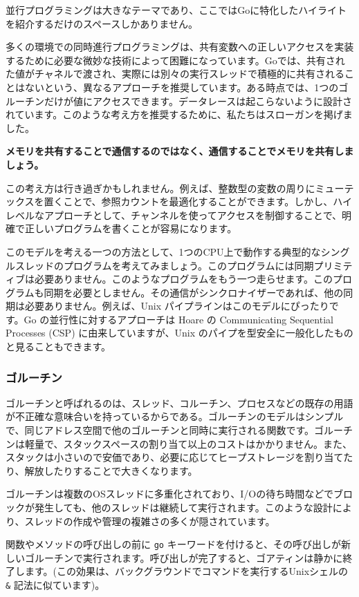 \documentclass{jsarticle}
\begin{document}
並行プログラミングは大きなテーマであり、ここではGoに特化したハイライトを紹介するだけのスペースしかありません。

多くの環境での同時進行プログラミングは、共有変数への正しいアクセスを実装するために必要な微妙な技術によって困難になっています。Goでは、共有された値がチャネルで渡され、実際には別々の実行スレッドで積極的に共有されることはないという、異なるアプローチを推奨しています。ある時点では、1つのゴルーチンだけが値にアクセスできます。データレースは起こらないように設計されています。このような考え方を推奨するために、私たちはスローガンを掲げました。

\textbf{メモリを共有することで通信するのではなく、通信することでメモリを共有しましょう。}

この考え方は行き過ぎかもしれません。例えば、整数型の変数の周りにミューテックスを置くことで、参照カウントを最適化することができます。しかし、ハイレベルなアプローチとして、チャンネルを使ってアクセスを制御することで、明確で正しいプログラムを書くことが容易になります。

このモデルを考える一つの方法として、1つのCPU上で動作する典型的なシングルスレッドのプログラムを考えてみましょう。このプログラムには同期プリミティブは必要ありません。このようなプログラムをもう一つ走らせます。このプログラムも同期を必要としません。その通信がシンクロナイザーであれば、他の同期は必要ありません。例えば、Unix
パイプラインはこのモデルにぴったりです。Go の並行性に対するアプローチは
Hoare の Communicating Sequential Processes (CSP)
に由来していますが、Unix
のパイプを型安全に一般化したものと見ることもできます。

\subsubsection{ゴルーチン}

ゴルーチンと呼ばれるのは、スレッド、コルーチン、プロセスなどの既存の用語が不正確な意味合いを持っているからである。ゴルーチンのモデルはシンプルで、同じアドレス空間で他のゴルーチンと同時に実行される関数です。ゴルーチンは軽量で、スタックスペースの割り当て以上のコストはかかりません。また、スタックは小さいので安価であり、必要に応じてヒープストレージを割り当てたり、解放したりすることで大きくなります。

ゴルーチンは複数のOSスレッドに多重化されており、I/Oの待ち時間などでブロックが発生しても、他のスレッドは継続して実行されます。このような設計により、スレッドの作成や管理の複雑さの多くが隠されています。

関数やメソッドの呼び出しの前に \texttt{go}
キーワードを付けると、その呼び出しが新しいゴルーチンで実行されます。呼び出しが完了すると、ゴアティンは静かに終了します。(この効果は、バックグラウンドでコマンドを実行するUnixシェルの
\texttt{\&} 記法に似ています)。
\end{document}

